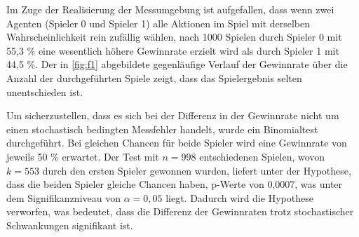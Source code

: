 Im Zuge der Realisierung der Messumgebung ist aufgefallen, dass wenn zwei Agenten (Spieler 0 und Spieler 1) alle Aktionen im Spiel mit derselben Wahrscheinlichkeit rein zufällig wählen, nach 1000 Spielen durch Spieler 0 mit 55,3 \% eine wesentlich höhere Gewinnrate erzielt wird als durch Spieler 1 mit 44,5 \%. Der in \ref{fig:f1} abgebildete gegenläufige Verlauf der Gewinnrate über die Anzahl der durchgeführten Spiele zeigt, dass das Spielergebnis selten unentschieden ist.

Um sicherzustellen, dass es sich bei der Differenz in der Gewinnrate nicht um einen stochastisch bedingten Messfehler handelt, wurde ein Binomialtest durchgeführt. Bei gleichen Chancen für beide Spieler wird eine Gewinnrate von jeweils 50 \% erwartet. Der Test mit $n = 998$ entschiedenen Spielen, wovon $k = 553$ durch den ersten Spieler gewonnen wurden, liefert unter der Hypothese, dass die beiden Spieler gleiche Chancen haben, p-Werte von 0,0007, was unter dem Signifikanzniveau von $\alpha = 0,05$ liegt. Dadurch wird die Hypothese verworfen, was bedeutet, dass die Differenz der Gewinnraten trotz stochastischer Schwankungen signifikant ist.


